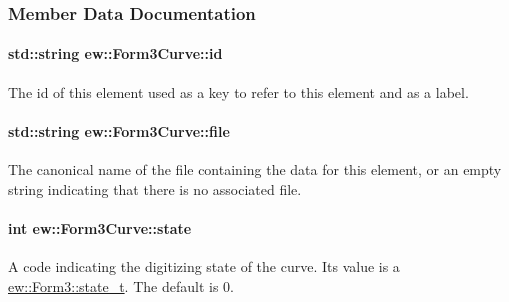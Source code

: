\subsubsection{Member Data Documentation}
\hypertarget{classew_1_1Form3Curve_a2bb3648bb9d075b67572de31ceb4f9c9}{
\paragraph[{id}]{\setlength{\rightskip}{0pt plus 5cm}std::string {\bf ew::Form3Curve::id}}\hfill}
\label{classew_1_1Form3Curve_a2bb3648bb9d075b67572de31ceb4f9c9}
The id of this element used as a key to refer to this element and as a label. \hypertarget{classew_1_1Form3Curve_ad5b09354438566c8f57710a5175858bb}{
\paragraph[{file}]{\setlength{\rightskip}{0pt plus 5cm}std::string {\bf ew::Form3Curve::file}}\hfill}
\label{classew_1_1Form3Curve_ad5b09354438566c8f57710a5175858bb}
The canonical name of the file containing the data for this element, or an empty string indicating that there is no associated file. \hypertarget{classew_1_1Form3Curve_aa0dbff46b3f4b6463e81adfc6855d2ee}{
\paragraph[{state}]{\setlength{\rightskip}{0pt plus 5cm}int {\bf ew::Form3Curve::state}}\hfill}
\label{classew_1_1Form3Curve_aa0dbff46b3f4b6463e81adfc6855d2ee}
A code indicating the digitizing state of the curve. Its value is a \hyperlink{classew_1_1Form3_a0fb1f90f8936fc647de8bf351aa0f725}{ew::Form3::state\_\-t}. The default is 0. 